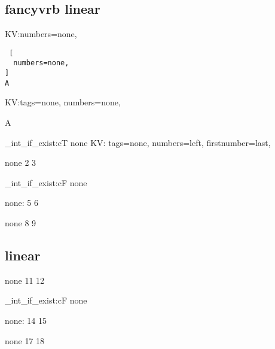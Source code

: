 \noindent

\subsection{\textsf{fancyvrb} linear}

\bgroup
\makeatletter
\def\CDR@Debug#1{\typeout{**** DEBUG #1}}
\ExplSyntaxOn
\ExplSyntaxOff
\makeatother

KV:numbers=none,
\begin{Verbatim} [
  numbers=none,
]
A
\end{Verbatim}
KV:tags=none, numbers=none,
\begin{CDRBlock} [
  tags=none,
  numbers=none,
]
A
\end{CDRBlock}
\ExplSyntaxOn
\CDR_int_if_exist:cT { none } {  }
\ExplSyntaxOff
{}
KV: tags=none, numbers=left, firstnumber=last,
\begin{CDRBlock}
none
2
3
\end{CDRBlock}
\ExplSyntaxOn
{}
\CDR_int_if_exist:cF { none } {  }
\ExplSyntaxOff
\begin{CDRBlock}
none:
5
6
\end{CDRBlock}
\ExplSyntaxOn
{}
\ExplSyntaxOff
\begin{CDRBlock}
none
8
9
\end{CDRBlock}
\ExplSyntaxOn
{}
\ExplSyntaxOff
\subsection{ linear}
\ExplSyntaxOn
\makeatletter
\makeatother
\ExplSyntaxOff

\begin{CDRBlock}
none
11
12
\end{CDRBlock}
\ExplSyntaxOn
{}
\CDR_int_if_exist:cF { none } {  }
\ExplSyntaxOff
\begin{CDRBlock}
none:
14
15
\end{CDRBlock}
\ExplSyntaxOn
{}
\ExplSyntaxOff
\begin{CDRBlock}
none
17
18
\end{CDRBlock}
\egroup

